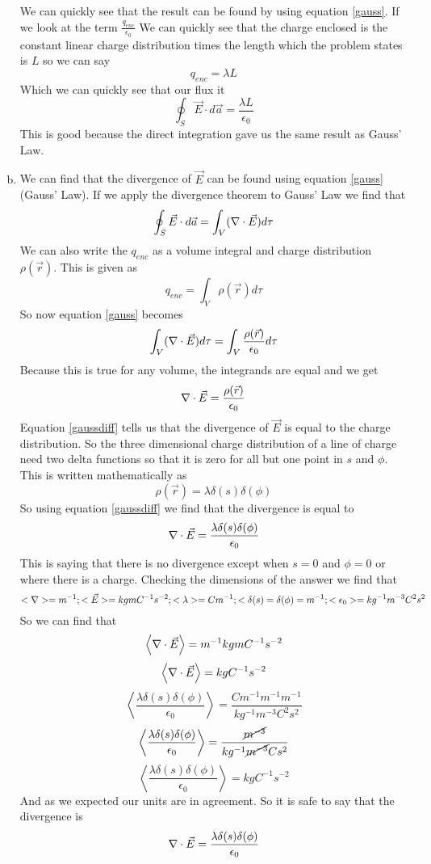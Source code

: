 \documentclass[11pt]{article}
\numberwithin{equation}{section}
\newcommand{\grad}{\bold\nabla}
\begin{document}
\begin{enumerate}[(a)]
We can quickly see that the result can be found by using equation \ref{gauss}. If we look at the term $\frac{q_{enc}}{\epsilon_0}$ We can quickly see that the charge enclosed is the constant linear charge distribution times the length which the problem states is $L$ so we can say
$$q_{enc} = \lambda L$$
Which we can quickly see that our flux it 
$$\oint_S \vec{E} \cdot d\vec{a} =\frac{\lambda L}{\epsilon_0}$$
This is good because the direct integration gave us the same result as Gauss' Law.

\item 
We can find that the divergence of $\vec{E}$ can be found using equation \ref{gauss} (Gauss' Law). If we apply the divergence theorem to Gauss' Law we find that
$$\oint_S \vec{E} \cdot d\vec{a} = \int_V (\grad \cdot \vec{E}) d\tau$$
We can also write the $q_{enc}$ as a volume integral and charge distribution $\rho(\vec{r})$. This is given as
$$q_{enc} = \int_V \rho(\vec{r}) d\tau$$
So now equation \ref{gauss} becomes
$$\int_V (\grad \cdot \vec{E}) d\tau = \int_V \frac{\rho(\vec{r})}{\epsilon_0} d\tau$$
Because this is true for any volume, the integrands are equal and we get
\begin{equation}
\grad \cdot \vec{E} = \frac{\rho(\vec{r})}{\epsilon_0}
\label{gaussdiff}
\end{equation}
Equation \ref{gaussdiff} tells us that the divergence of $\vec{E}$ is equal to the charge distribution. So the three dimensional charge distribution of a line of charge need two delta functions so that it is zero for all but one point in $s$ and $\phi$. This is written mathematically as
$$\rho(\vec{r}) = \lambda \delta(s)\delta(\phi)$$
So using equation \ref{gaussdiff} we find that the divergence is equal to 
$$\grad \cdot \vec{E} = \frac{\lambda \delta(s)\delta(\phi)}{\epsilon_0}$$
This is saying that there is no divergence except when $s=0$ and $\phi=0$ or where there is a charge.
Checking the dimensions of the answer we find that
$$<\grad> = m^{-1}; <\vec{E}> = kg m C^{-1} s^{-2}; <\lambda> = C m^{-1}; <\delta(s) = \delta(\phi) = m^{-1}; <\epsilon_0> = kg^{-1} m^{-3} C^2 s^2$$
So we can find that
$$\left<\grad \cdot \vec{E}\right> = m^{-1} kg m C^{-1} s^{-2}$$
$$\left<\grad \cdot \vec{E}\right> = kg C^{-1} s^{-2}$$
$$\left<\frac{\lambda \delta(s)\delta(\phi)}{\epsilon_0}\right> = \frac{Cm^{-1}m^{-1}m^{-1}}{kg^{-1} m^{-3} C^2 s^2} $$
$$\left<\frac{\lambda \delta(s)\delta(\phi)}{\epsilon_0}\right> = \frac{\cancel{m^{-3}}}{kg^{-1} \cancel{m^{-3}} C s^2} $$
$$\left<\frac{\lambda \delta(s)\delta(\phi)}{\epsilon_0}\right> = kg C^{-1} s^{-2}$$
And as we expected our units are in agreement. So it is safe to say that the divergence is 
$$\grad \cdot \vec{E} = \frac{\lambda \delta(s)\delta(\phi)}{\epsilon_0}$$
\end{enumerate}
\end{document}
